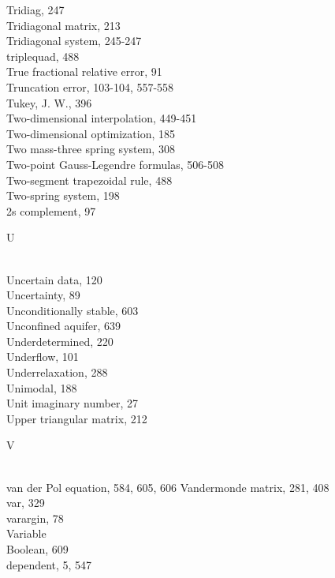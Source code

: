 \documentclass[../main.tex]{subfiles}
\begin{document}
\begin{multicols}{3}
    Tridiag, 247\\
    Tridiagonal matrix, 213\\
    Tridiagonal system, 245-247\\
    triplequad, 488\\
    True fractional relative error, 91\\
    Truncation error, 103-104, 557-558\\
    Tukey, J. W., 396\\
    Two-dimensional interpolation, 449-451\\
    Two-dimensional optimization, 185\\
    Two mass-three spring system, 308\\
    Two-point Gauss-Legendre formulas, 506-508\\
    Two-segment trapezoidal rule, 488\\
    Two-spring system, 198\\
    2s complement, 97\vspace*{2mm}\\
    \begin{huge} U \end{huge}\\
    Uncertain data, 120\\
    Uncertainty, 89\\
    Unconditionally stable, 603\\
    Unconfined aquifer, 639\\
    Underdetermined, 220\\
    Underflow, 101\\
    Underrelaxation, 288\\
    Unimodal, 188\\
    Unit imaginary number, 27\\
    Upper triangular matrix, 212\vspace*{2mm}\\
    \begin{huge} V \end{huge}\\
    van der Pol equation, 584, 605, 606
    Vandermonde matrix, 281, 408\\
    var, 329\\
    varargin, 78\\
    Variable\\
    \hspace*{3mm}Boolean, 609\\
    \hspace*{3mm}dependent, 5, 547\\

\end{multicols}
\end{document}
